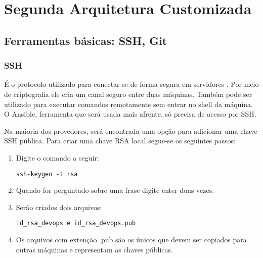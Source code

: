 

 

\section{Segunda Arquitetura Customizada }

\subsection{Ferramentas básicas: SSH, Git}

\subsubsection{SSH}

É o protocolo utilizado para conectar-se de forma 
segura em servidores \cite{barret2005ssh}.
Por meio de criptografia ele cria um canal
seguro entre duas máquinas. Também 
pode ser utilizado para executar comandos 
remotamente sem entrar no shell da máquina.
O Ansible, ferramenta que será usada mais afrente, 
só precisa de acesso por SSH.

Na maioria dos provedores, será encontrada uma 
opção para adicionar uma chave SSH pública.
Para criar uma chave RSA local segue-se os 
seguintes passos:
 \begin{enumerate}
   \item Digite o comando a seguir:
	
      \begin{lstlisting}
ssh-keygen -t rsa
      \end{lstlisting}
   
   \item Quando for perguntado sobre uma frase digite 
      enter duas vezes.
    \item Serão criados dois arquivos:
    \begin{lstlisting}
id_rsa_devops e id_rsa_devops.pub
    \end{lstlisting}
    
    \item Os arquivos com extenção .pub são os únicos 
	  que devem ser copiados para outras máquinas 
	  e representam as chaves públicas.

 \end{enumerate} 

